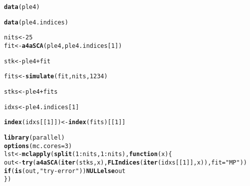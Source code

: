 \documentclass[a4paper,english,10pt]{article}\usepackage[]{graphicx}\usepackage[]{color}
\makeatletter
\newcommand{\hlnum}[1]{\textcolor[rgb]{0.686,0.059,0.569}{#1}}%
\newcommand{\hlstr}[1]{\textcolor[rgb]{0.192,0.494,0.8}{#1}}%
\newcommand{\hlopt}[1]{\textcolor[rgb]{0,0,0}{#1}}%
\newcommand{\hlstd}[1]{\textcolor[rgb]{0.345,0.345,0.345}{#1}}%
\newcommand{\hlkwa}[1]{\textcolor[rgb]{0.161,0.373,0.58}{\textbf{#1}}}%
\newcommand{\hlkwb}[1]{\textcolor[rgb]{0.69,0.353,0.396}{#1}}%
\newcommand{\hlkwc}[1]{\textcolor[rgb]{0.333,0.667,0.333}{#1}}%
\newcommand{\hlkwd}[1]{\textcolor[rgb]{0.737,0.353,0.396}{\textbf{#1}}}%
\newenvironment{kframe}{%
 \def\at@end@of@kframe{}%
 \ifinner\ifhmode%
  \def\at@end@of@kframe{\end{minipage}}%
  \begin{minipage}{\columnwidth}%
 \fi\fi%
 \def\FrameCommand##1{\hskip\@totalleftmargin \hskip-\fboxsep
 \colorbox{shadecolor}{##1}\hskip-\fboxsep
     \hskip-\linewidth \hskip-\@totalleftmargin \hskip\columnwidth}%
 \MakeFramed {\advance\hsize-\width
   \@totalleftmargin\z@ \linewidth\hsize
   \@setminipage}}%
 {\par\unskip\endMakeFramed%
 \at@end@of@kframe}
\newenvironment{knitrout}{}{} %
\makeatother
\begin{document}
\begin{knitrout}
\color{fgcolor}\begin{kframe}
\begin{alltt}
\hlkwd{data}\hlstd{(ple4)}
\end{alltt}


{\ttfamily\noindent\color{warningcolor}{\#\# Warning: data set 'ple4' not found}}\begin{alltt}
\hlkwd{data}\hlstd{(ple4.indices)}
\end{alltt}


{\ttfamily\noindent\color{warningcolor}{\#\# Warning: data set 'ple4.indices' not found}}\begin{alltt}
\hlstd{nits} \hlkwb{<-} \hlnum{25}
\hlstd{fit} \hlkwb{<-} \hlkwd{a4aSCA}\hlstd{(ple4, ple4.indices[}\hlnum{1}\hlstd{])}
\end{alltt}


{\ttfamily\noindent\bfseries{}}\begin{alltt}
\hlstd{stk} \hlkwb{<-} \hlstd{ple4} \hlopt{+} \hlstd{fit}
\end{alltt}


{\ttfamily\noindent\bfseries\color{errorcolor}{\#\# Error: object 'ple4' not found}}\begin{alltt}
\hlstd{fits} \hlkwb{<-} \hlkwd{simulate}\hlstd{(fit, nits,} \hlnum{1234}\hlstd{)}
\end{alltt}


{\ttfamily\noindent\bfseries\color{errorcolor}{\#\# Error: object 'fit' not found}}\begin{alltt}
\hlstd{stks} \hlkwb{<-} \hlstd{ple4} \hlopt{+} \hlstd{fits}
\end{alltt}


{\ttfamily\noindent\bfseries\color{errorcolor}{\#\# Error: object 'ple4' not found}}\begin{alltt}
\hlstd{idxs} \hlkwb{<-} \hlstd{ple4.indices[}\hlnum{1}\hlstd{]}
\end{alltt}


{\ttfamily\noindent\bfseries\color{errorcolor}{\#\# Error: object 'ple4.indices' not found}}\begin{alltt}
\hlkwd{index}\hlstd{(idxs[[}\hlnum{1}\hlstd{]])} \hlkwb{<-} \hlkwd{index}\hlstd{(fits)[[}\hlnum{1}\hlstd{]]}
\end{alltt}


{\ttfamily\noindent\bfseries{}}\begin{alltt}
\hlkwd{library}\hlstd{(parallel)}
\hlkwd{options}\hlstd{(}\hlkwc{mc.cores}\hlstd{=}\hlnum{3}\hlstd{)}
\hlstd{lst} \hlkwb{<-} \hlkwd{mclapply}\hlstd{(}\hlkwd{split}\hlstd{(}\hlnum{1}\hlopt{:}\hlstd{nits,} \hlnum{1}\hlopt{:}\hlstd{nits),} \hlkwa{function}\hlstd{(}\hlkwc{x}\hlstd{)\{}
        \hlstd{out} \hlkwb{<-} \hlkwd{try}\hlstd{(}\hlkwd{a4aSCA}\hlstd{(}\hlkwd{iter}\hlstd{(stks, x),} \hlkwd{FLIndices}\hlstd{(}\hlkwd{iter}\hlstd{(idxs[[}\hlnum{1}\hlstd{]], x)),} \hlkwc{fit}\hlstd{=}\hlstr{"MP"}\hlstd{))}
        \hlkwa{if}\hlstd{(}\hlkwd{is}\hlstd{(out,} \hlstr{"try-error"}\hlstd{))} \hlkwa{NULL else} \hlstd{out}
\hlstd{\})}


\end{alltt}
\end{kframe}
\end{knitrout}
\end{document}
